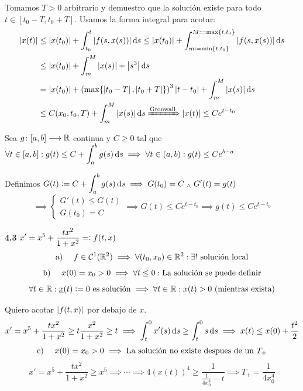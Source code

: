 Tomamos $T>0$ arbitrario y demuestro que la solución existe para todo $t\in [t_0-T, t_0+T]$. Usamos la forma integral para acotar:
\[\begin{aligned}
		\abs{x(t)} & \leq \abs{x(t_0)} + \int_{t_0}^{t} \abs{f(s, x(s))} \odif{s} \leq \abs{x(t_0)} + \int_{m\defeq \min\{t, t_0\}}^{M\defeq \max\{t, t_0\}} \abs{f(s, x(s))} \odif{s} \\
		           & \leq \abs{x(t_0)} + \int_{m}^{M} \abs{x(s)} + \abs{s^3} \odif{s}                                                                                                  \\
		           & = \abs{x(t_0)} + \left(\max\{\abs{t_0-T}, \abs{t_0+T}\}\right)^3\abs{t-t_0} + \int_{m}^{M} \abs{x(s)} \odif{s}                                                    \\
		           & \leq C(x_0, t_0, T) + \int_{m}^{M} \abs{x(s)} \odif{s} \xRightarrow{\tex{Gronwall}} \abs{x(t)} \leq Ce^{t-t_0}
	\end{aligned}\]

\begin{lem}[Gronwall]
	Sea $g \colon [a, b] \longrightarrow \mathbb{R}$ continua y $C\geq 0$ tal que \\
	$\ds \forall t \in [a, b] : g(t) \leq C + \int_{a}^{b} g(s) \odif{s}\implies \forall t \in (a, b) : g(t) \leq Ce^{b-a}$
	\begin{dem}
		Definimos $\ds G(t) \defeq C + \int_a^b g(s) \odif{s}\implies G(t_0) = C \we G'(t) = g(t) $
		\[\implies \begin{cases}
				G'(t) \leq G(t) \\
				G(t_0) = C
			\end{cases}\implies G(t) \leq C e^{t-t_0} \implies g(t) \leq C e^{t-t_0}\]
	\end{dem}
\end{lem}

\textbf{4.3} $\displaystyle x'=x^5 + \frac{tx^2}{1+x^2} =\vcentcolon f(t,x)$
\[\text{a) } \quad f\in \mathcal{C}^1(\mathbb{R}^2) \implies \forall (t_0, x_0) \in \mathbb{R}^2 : \exists ! \text{ solución local}\]
\[\text{b) } \quad x(0) = x_0 > 0 \implies \forall t \leq 0 : \text{La solución se puede definir}\]
\[\forall t \in \mathbb{R} : \underline{x}(t) \vcentcolon= 0 \text{ es solución} \implies \forall t \in \mathbb{R} : x(t) > 0 \text{ (mientras exista)}\]

Quiero acotar $\left|f(t, x)\right|$ por debajo de $x$.
\[x' = x^5 + \frac{tx^2}{1+x^2} \geq t\frac{x^2}{1+x^2} \geq t\implies \int_t^0 x'(s) \odif{s} \geq \int_t^0 s \odif{s} \implies x(t) \leq x(0)+ \frac{t^2}{2}\]
\[\text{c) } \quad x(0) = x_0 > 0 \implies \text{La solución no existe despues de un }T_+\]
\[x'= x^5 + \frac{tx^2}{1+x^2} \geq x^5 \implies \cdots \implies 4(x(t))^4 \geq \frac{1}{\frac{1}{4x_0^4} - t} \implies \boxed{T_+ = \frac{1}{4x_0^4}}\]

